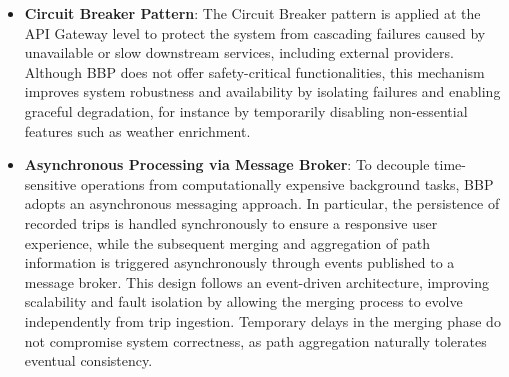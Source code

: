 \begin{itemize}
    \item \textbf{Circuit Breaker Pattern}:  
    The Circuit Breaker pattern is applied at the API Gateway level to protect the system from cascading failures caused by unavailable or slow downstream services, including external providers.
    Although BBP does not offer safety-critical functionalities, this mechanism improves system robustness and availability by isolating failures and enabling graceful degradation, for instance by temporarily disabling non-essential features such as weather enrichment.

    
    \item \textbf{Asynchronous Processing via Message Broker}:  
    To decouple time-sensitive operations from computationally expensive background tasks, BBP adopts an asynchronous messaging approach.
    In particular, the persistence of recorded trips is handled synchronously to ensure a responsive user experience, while the subsequent merging and aggregation of path information is triggered asynchronously through events published to a message broker.
    This design follows an event-driven architecture, improving scalability and fault isolation by allowing the merging process to evolve independently from trip ingestion. Temporary delays in the merging phase do not compromise system correctness, as path aggregation naturally tolerates eventual consistency.

    
\end{itemize}
